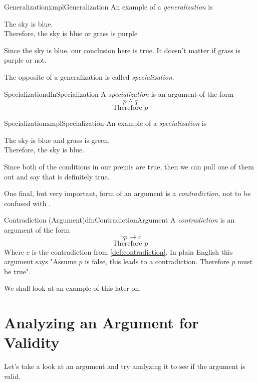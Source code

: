 \begin{exmpl}[label={exmpl:generalization}]{Generalization}{xmplGeneralization}
    An example of a \emph{generalization} is
    \begin{center}
        The sky is blue.\\
        Therefore, the sky is blue or grass is purple
    \end{center}
    Since the sky is blue, our conclusion here is true. It doesn't matter if grass is purple or not.
\end{exmpl}
\vspace{1cm}

The opposite of a generalization is called \emph{specialization}.

\begin{dfn}[label={def:specialization}]{Specialization}{dfnSpecialization}
    A \emph{specialization} is an argument of the form
    $$p \land q$$
    $$\text{Therefore } p$$
\end{dfn}

\begin{exmpl}[label={exmpl:specialization}]{Specialization}{xmplSpecialization}
    An example of a \emph{specialization} is
    \begin{center}
        The sky is blue and grass is green.\\
        Therefore, the sky is blue.
    \end{center}
    Since both of the conditions in our premis are true, then we can pull one of them out and say that is definitely true.
\end{exmpl}
\newpage

One final, but very important, form of an argument is a \emph{contradiction}, not to be confused with .

\begin{dfn}[label={def:contradictionArgument}]{Contradiction (Argument)}{dfnContradictionArgument}
    A \emph{contradiction} is an argument of the form
    $$\lnot p \to c$$
    $$\text{Therefore } p$$
    Where $c$ is the contradiction from \cref{def:contradiction}. In plain English this argument says "Assume $p$ is false, this leads to a contradiction. Therefore $p$ must be true".
\end{dfn}
\vspace{1cm}
We shall look at an example of this later on.

\section{Analyzing an Argument for Validity}
Let's take a look at an argument and try analyzing it to see if the argument is valid.

